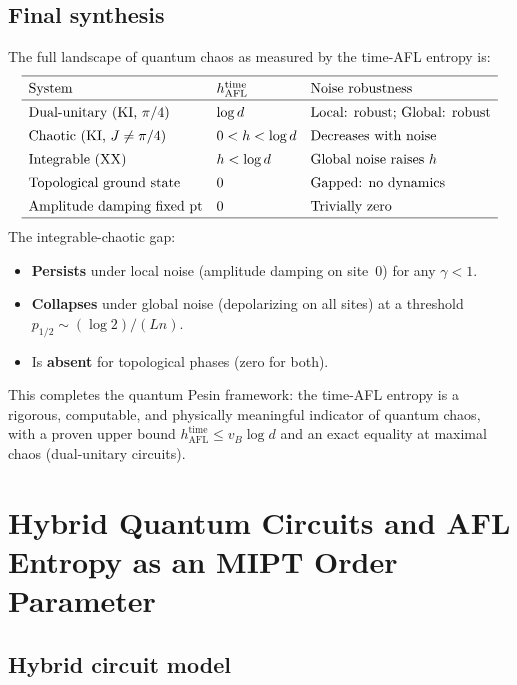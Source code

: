 \documentclass[12pt,a4paper]{article}
\begin{document}
\subsection{Final synthesis}

The full landscape of quantum chaos as measured by the time-AFL entropy
is:
\[
\renewcommand{\arraystretch}{1.4}
\begin{array}{lll}
\hline
\text{System} & h_{\mathrm{AFL}}^{\mathrm{time}} & \text{Noise robustness}\\
\hline
\text{Dual-unitary (KI, }\pi/4) & \log d & \text{Local: robust; Global: robust}\\
\text{Chaotic (KI, }J\ne\pi/4) & 0 < h < \log d & \text{Decreases with noise}\\
\text{Integrable (XX)} & h < \log d & \text{Global noise raises }h\\
\text{Topological ground state} & 0 & \text{Gapped: no dynamics}\\
\text{Amplitude damping fixed pt} & 0 & \text{Trivially zero}\\
\hline
\end{array}
\]
The integrable-chaotic gap:
\begin{itemize}
\item \textbf{Persists} under local noise (amplitude damping on site~$0$)
  for any $\gamma<1$.
\item \textbf{Collapses} under global noise (depolarizing on all sites)
  at a threshold $p_{1/2}\sim(\log 2)/(Ln)$.
\item Is \textbf{absent} for topological phases (zero for both).
\end{itemize}
This completes the quantum Pesin framework: the time-AFL entropy is a
rigorous, computable, and physically meaningful indicator of quantum chaos,
with a proven upper bound $h_{\mathrm{AFL}}^{\mathrm{time}}\leq v_B\log d$
and an exact equality at maximal chaos (dual-unitary circuits).

\section{Hybrid Quantum Circuits and AFL Entropy as an MIPT Order Parameter}
\label{sec:mipt_afl}

\subsection{Hybrid circuit model}
\end{document}
